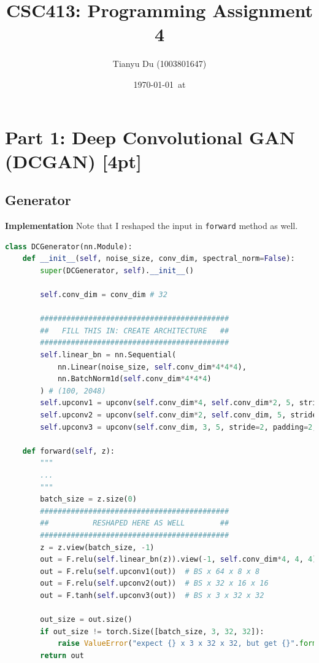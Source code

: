 \documentclass{article}
\title{CSC413: Programming Assignment 4}
\date{\today\ at \currenttime}
\author{Tianyu Du (1003801647)}
\begin{document}
	\maketitle
	\section{Part 1: Deep Convolutional GAN (DCGAN) [4pt]}
	\subsection{Generator}
	\textbf{Implementation} Note that I reshaped the input in \texttt{forward} method as well.
	\begin{lstlisting}[language=python]
class DCGenerator(nn.Module):
    def __init__(self, noise_size, conv_dim, spectral_norm=False):
        super(DCGenerator, self).__init__()

        self.conv_dim = conv_dim # 32

        ###########################################
        ##   FILL THIS IN: CREATE ARCHITECTURE   ##
        ###########################################
        self.linear_bn = nn.Sequential(
            nn.Linear(noise_size, self.conv_dim*4*4*4),
            nn.BatchNorm1d(self.conv_dim*4*4*4)
        ) # (100, 2048)
        self.upconv1 = upconv(self.conv_dim*4, self.conv_dim*2, 5, stride=2, padding=2, batch_norm=True, spectral_norm=spectral_norm)
        self.upconv2 = upconv(self.conv_dim*2, self.conv_dim, 5, stride=2, padding=2, batch_norm=True, spectral_norm=spectral_norm)
        self.upconv3 = upconv(self.conv_dim, 3, 5, stride=2, padding=2, batch_norm=False, spectral_norm=spectral_norm)

    def forward(self, z):
        """
        ...
        """
        batch_size = z.size(0)
        ###########################################
        ##   		RESHAPED HERE AS WELL	     ##
        ###########################################
        z = z.view(batch_size, -1)
        out = F.relu(self.linear_bn(z)).view(-1, self.conv_dim*4, 4, 4)    # BS x 128 x 4 x 4
        out = F.relu(self.upconv1(out))  # BS x 64 x 8 x 8
        out = F.relu(self.upconv2(out))  # BS x 32 x 16 x 16
        out = F.tanh(self.upconv3(out))  # BS x 3 x 32 x 32
        
        out_size = out.size()
        if out_size != torch.Size([batch_size, 3, 32, 32]):
            raise ValueError("expect {} x 3 x 32 x 32, but get {}".format(batch_size, out_size))
        return out
	\end{lstlisting}
\end{document}
